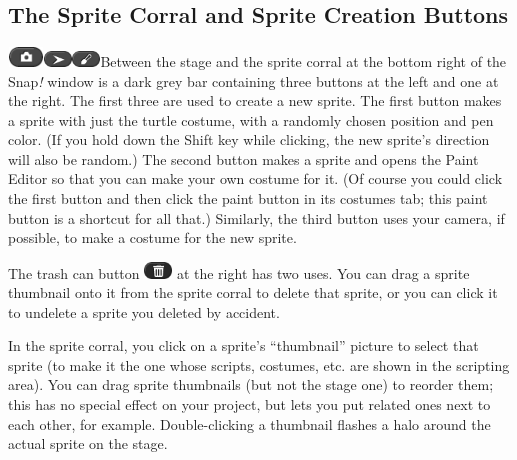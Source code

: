 \subsection{The Sprite Corral and Sprite Creation
Buttons}\label{the-sprite-corral-and-sprite-creation-buttons}

\includegraphics[width=0.37917in,height=0.20556in]{media/image1083.png}\includegraphics[width=0.29167in,height=0.16667in]{media/image1124.png}\includegraphics[width=0.29167in,height=0.16667in]{media/image1125.png}Between
the stage and the sprite corral at the bottom right of the Snap\emph{!}
window is a dark grey bar containing three buttons at the left and one
at the right. The first three are used to create a new sprite. The first
button makes a sprite with just the turtle costume, with a randomly
chosen position and pen color. (If you hold down the Shift key while
clicking, the new sprite's direction will also be random.) The second
button makes a sprite and opens the Paint Editor so that you can make
your own costume for it. (Of course you could click the first button and
then click the paint button in its costumes tab; this paint button is a
shortcut for all that.) Similarly, the third button uses your camera, if
possible, to make a costume for the new sprite.

The trash can button
\includegraphics[width=0.29167in,height=0.17361in]{media/image1126.png}
at the right has two uses. You can drag a sprite thumbnail onto it from
the sprite corral to delete that sprite, or you can click it to undelete
a sprite you deleted by accident.

In the sprite corral, you click on a sprite's ``thumbnail'' picture to
select that sprite (to make it the one whose scripts, costumes, etc. are
shown in the scripting area). You can drag sprite thumbnails (but not
the stage one) to reorder them; this has no special effect on your
project, but lets you put related ones next to each other, for example.
Double-clicking a thumbnail flashes a halo around the actual sprite on
the stage.

